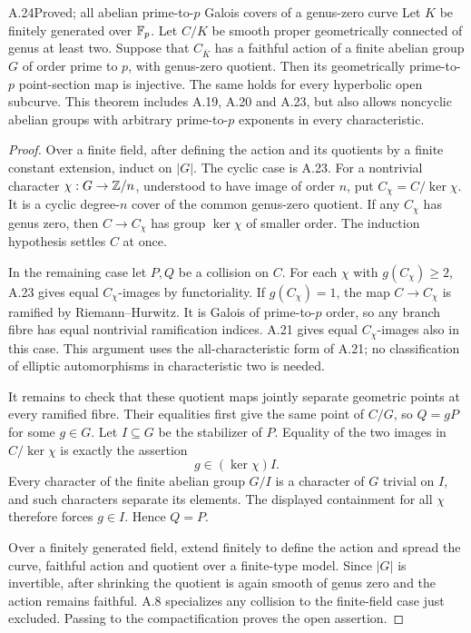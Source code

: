 \begin{claim}{A.24}{Proved; all abelian prime-to-$p$ Galois covers of a genus-zero curve}
Let $K$ be finitely generated over $\mathbb F_p$. Let $C/K$ be
smooth proper geometrically connected of genus at least
two. Suppose that $C_{\overline K}$ has a faithful action
of a finite abelian group $G$ of order prime to $p$, with
genus-zero quotient. Then its geometrically prime-to-$p$
point-section map is injective. The same holds for every
hyperbolic open subcurve. This theorem includes A.19,
A.20 and A.23, but also allows noncyclic abelian groups
with arbitrary prime-to-$p$ exponents in every characteristic.
\end{claim}
\begin{proof}
Over a finite field, after defining the action and its
quotients by a finite constant extension, induct on $|G|$.
The cyclic case is A.23. For a nontrivial character
$\chi:G\to\mathbb Z/n$, understood to have image of order $n$,
put $C_\chi=C/\ker\chi$. It is a cyclic degree-$n$
cover of the common genus-zero quotient. If any
$C_\chi$ has genus zero, then $C\to C_\chi$ has group
$\ker\chi$ of smaller order. The induction hypothesis
settles $C$ at once.

In the remaining case let $P,Q$ be a collision on $C$.
For each $\chi$ with $g(C_\chi)\ge2$, A.23 gives equal
$C_\chi$-images by functoriality. If $g(C_\chi)=1$, the
map $C\to C_\chi$ is ramified by Riemann--Hurwitz. It is
Galois of prime-to-$p$ order, so any branch fibre has
equal nontrivial ramification indices. A.21 gives equal
$C_\chi$-images also in this case. This argument uses
the all-characteristic form of A.21; no classification
of elliptic automorphisms in characteristic two is needed.

It remains to check that these quotient maps jointly
separate geometric points at every ramified fibre. Their
equalities first give the same point of $C/G$, so
$Q=gP$ for some $g\in G$. Let $I\subseteq G$ be the
stabilizer of $P$. Equality of the two images in
$C/\ker\chi$ is exactly the assertion
\[
 g\in(\ker\chi)I.
\]
Every character of the finite abelian group $G/I$ is a
character of $G$ trivial on $I$, and such characters
separate its elements. The displayed containment for
all $\chi$ therefore forces $g\in I$. Hence $Q=P$.

Over a finitely generated field, extend finitely to define
the action and spread the curve, faithful action and
quotient over a finite-type model. Since $|G|$ is
invertible, after shrinking the quotient is again smooth
of genus zero and the action remains faithful. A.8
specializes any collision to the finite-field case just
excluded. Passing to the compactification proves the
open assertion.
\end{proof}

